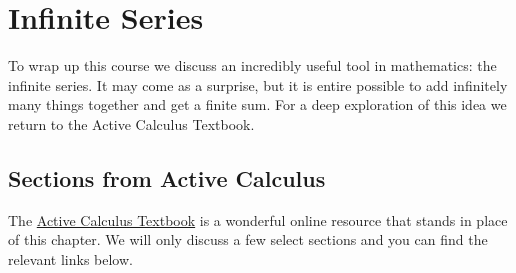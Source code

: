 \chapter{Infinite Series}
To wrap up this course we discuss an incredibly useful tool in mathematics: the infinite
series.  It may come as a surprise, but it is entire possible to add infinitely many
things together and get a finite sum.  For a deep exploration of this idea we return to
the Active Calculus Textbook.

\section{Sections from Active Calculus}
The \href{http://faculty.gvsu.edu/boelkinm/Home/AC/index.html}{Active Calculus Textbook}
is a wonderful online resource that stands in place of this chapter.  We will only discuss a
few select sections and you can find the relevant links below.    
